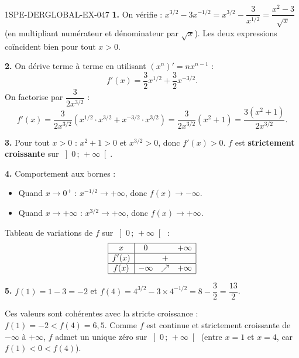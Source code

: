\begin{corrige}{1SPE-DERGLOBAL-EX-047}
\textbf{1.} On vérifie : $x^{3/2} - 3x^{-1/2} = x^{3/2} - \dfrac{3}{x^{1/2}}
= \dfrac{x^2 - 3}{\sqrt{x}}$ (en multipliant numérateur et dénominateur par $\sqrt{x}$).
Les deux expressions coïncident bien pour tout $x > 0$.

\textbf{2.} On dérive terme à terme en utilisant $(x^n)' = nx^{n-1}$ :
\[
f'(x) = \frac{3}{2}x^{1/2} + \frac{3}{2}x^{-3/2}.
\]
On factorise par $\dfrac{3}{2x^{3/2}}$ :
\[
f'(x) = \frac{3}{2x^{3/2}}\!\left(x^{1/2} \cdot x^{3/2} + x^{-3/2} \cdot x^{3/2}\right) = \frac{3}{2x^{3/2}}\!\left(x^2 + 1\right) = \frac{3(x^2+1)}{2x^{3/2}}.
\]

\textbf{3.} Pour tout $x > 0$ : $x^2 + 1 > 0$ et $x^{3/2} > 0$, donc $f'(x) > 0$.
$f$ est \textbf{strictement croissante} sur $\left]0\,;\,+\infty\right[$.

\textbf{4.} Comportement aux bornes :
\begin{itemize}
  \item Quand $x \to 0^+$ : $x^{-1/2} \to +\infty$, donc $f(x) \to -\infty$.
  \item Quand $x \to +\infty$ : $x^{3/2} \to +\infty$, donc $f(x) \to +\infty$.
\end{itemize}

Tableau de variations de $f$ sur $\left]0\,;\,+\infty\right[$ :
\[
\begin{array}{|c|ccc|}
\hline
x     & 0 & & +\infty \\
\hline
f'(x) &   & + & \\
\hline
f(x)  & -\infty & \nearrow & +\infty \\
\hline
\end{array}
\]

\textbf{5.} $f(1) = 1 - 3 = \boxed{-2}$ et $f(4) = 4^{3/2} - 3 \times 4^{-1/2} = 8 - \dfrac{3}{2} = \boxed{\dfrac{13}{2}}$.

Ces valeurs sont cohérentes avec la stricte croissance : $f(1) = -2 < f(4) = 6{,}5$.
Comme $f$ est continue et strictement croissante de $-\infty$ à $+\infty$,
$f$ admet un unique zéro sur $\left]0\,;\,+\infty\right[$ (entre $x=1$ et $x=4$, car $f(1) < 0 < f(4)$).
\end{corrige}
